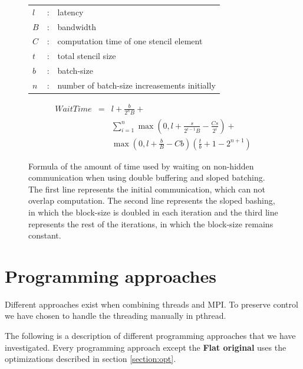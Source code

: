 \documentclass[preprint,3p,times,twocolumn]{elsarticle}
\begin{document}
\begin{figure}
 \centering
\begin{footnotesize}
\begin{tabular}{p{2mm} l l}
$l$  &:& latency\\
$B$  &:& bandwidth\\
$C$  &:& computation time of one stencil element\\
$t$  &:& total stencil size\\
$b$  &:& batch-size\\
$n$  &:& number of batch-size increasements initially
\end{tabular}
\begin{eqnarray*}
WaitTime &=& l + \frac{b}{2^{n} B} + \nonumber \\
&&\sum_{i=1}^{n} \max \left(0, l+ \frac{s}{2^{i-1} B} - \frac{C s}{2^{i}}\right) + \nonumber \\
&&\max \left(0, l+ \frac{b}{B} - C b\right)\left(\frac{t}{b} + 1 - 2^{n+1} \right)
\end{eqnarray*}
\vspace{-5mm}
\end{footnotesize}
 \caption{Formula of the amount of time used by waiting on non-hidden communication when using double buffering and sloped batching. The first line represents the initial communication, which can not overlap computation. The second line represents the sloped bashing, in which the block-size is doubled in each iteration and the third line represents the rest of the iterations, in which the block-size remains constant.}
 \label{fig:waittime}
\end{figure}


\section{Programming approaches}
Different approaches exist when combining threads and MPI. To preserve control we have chosen to handle the threading manually in pthread.

The following is a description of different programming approaches that we have investigated. Every programming approach except the \textbf{Flat original} uses the optimizations described in section \ref{section:opt}.
\end{document}

